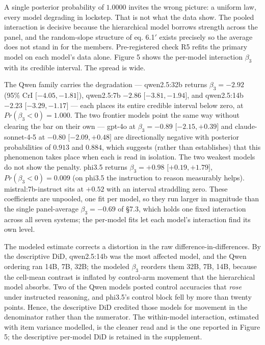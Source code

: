 \documentclass{article}
\begin{document}
A single posterior probability of \(1.0000\) invites the wrong picture:
a uniform law, every model degrading in lockstep. That is not what the
data show. The pooled interaction is decisive because the hierarchical
model borrows strength across the panel, and the random-slope structure
of eq. 6.1\ensuremath{\prime} exists precisely so the average does not stand in for the
members. Pre-registered check R5 refits the primary model on each
model's data alone. Figure 5 shows the per-model interaction
\(\beta_{3}\) with its credible interval. The spread is wide.

The Qwen family carries the degradation --- qwen2.5:32b returns
\(\beta_{3} = - 2.92\) (95\% CrI \(\lbrack - 4.05, - 1.81\rbrack\)),
qwen2.5:7b \(- 2.86\) \(\lbrack - 3.81, - 1.94\rbrack\), and qwen2.5:14b
\(- 2.23\) \(\lbrack - 3.29, - 1.17\rbrack\) --- each places its entire
credible interval below zero, at \(Pr(\beta_{3} < 0) = 1.000\). The two
frontier models point the same way without clearing the bar on their own
--- gpt-4o at \(\beta_{3} = - 0.89\) \(\lbrack - 2.15, + 0.39\rbrack\)
and claude-sonnet-4-5 at \(- 0.80\) \(\lbrack - 2.09, + 0.48\rbrack\)
are directionally negative with posterior probabilities of \(0.913\) and
\(0.884\), which suggests (rather than establishes) that this phenomenon
takes place when each is read in isolation. The two weakest models do
not show the penalty. phi3.5 returns \(\beta_{3} = + 0.98\)
\(\lbrack + 0.19, + 1.79\rbrack\), \(Pr(\beta_{3} < 0) = 0.009\) (on
phi3.5 the instruction to reason measurably helps). mistral:7b-instruct
sits at \(+ 0.52\) with an interval straddling zero. These coefficients
are unpooled, one fit per model, so they run larger in magnitude than
the single panel-average \(\beta_{3} = - 0.69\) of \S{}7.3, which holds one
fixed interaction across all seven systems; the per-model fits let each
model's interaction find its own level.

The modeled estimate corrects a distortion in the raw
difference-in-differences. By the descriptive DiD, qwen2.5:14b was the
most affected model, and the Qwen ordering ran 14B, 7B, 32B; the modeled
\(\beta_{3}\) reorders them 32B, 7B, 14B, because the cell-mean contrast
is inflated by control-arm movement that the hierarchical model absorbs.
Two of the Qwen models posted control accuracies that \emph{rose} under
instructed reasoning, and phi3.5's control block fell by more than
twenty points. Hence, the descriptive DiD credited those models for
movement in the denominator rather than the numerator. The within-model
interaction, estimated with item variance modelled, is the cleaner read
and is the one reported in Figure 5; the descriptive per-model DiD is
retained in the supplement.
\end{document}
